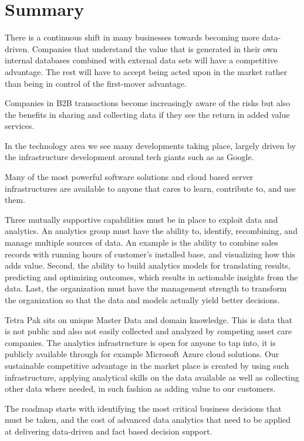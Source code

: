 \documentclass[10pt]{article} %
\begin{document}
\section{Summary}

There is a continuous shift in many businesses towards becoming more data-driven. Companies that understand the value that is generated in their own internal databases combined with external data sets will have a competitive advantage. The rest will have to accept being acted upon in the market rather than being in control of the first-mover advantage.

Companies in B2B transactions become increasingly aware of the risks but also the benefits in sharing and collecting data if they see the return in added value services.

In the technology area we see many developments taking place, largely driven by the infrastructure development around tech giants such as as Google.


Many of the most powerful software solutions and cloud based server infrastructures are available to anyone that cares to learn, contribute to, and use them.


Three mutually supportive capabilities must be in place to exploit data and analytics. An analytics group must have the ability to, identify, recombining, and manage multiple sources of data. An example is the ability to combine sales records with running hours of customer's installed base, and visualizing how this adds value. Second, the ability to build analytics models for translating results, predicting and optimizing outcomes, which results in actionable insights from the data. Last, the organization must have the management strength to transform the organization so that the data and models actually yield better decisions.


Tetra Pak sits on unique Master Data and domain knowledge. This is data that is not public and also not easily collected and analyzed by competing asset care companies. The analytics infrastructure is open for anyone to tap into, it is publicly available through for example Microsoft Azure cloud solutions. Our sustainable competitive advantage in the market place is created by using such infrastructure, applying analytical skills on the data available as well as collecting other data where needed, in such fashion as adding value to our customers. 

The roadmap starts with identifying the most critical business decisions that must be taken, and the cost of advanced data analytics that need to be applied at delivering data-driven and fact based decision support.
\end{document}
